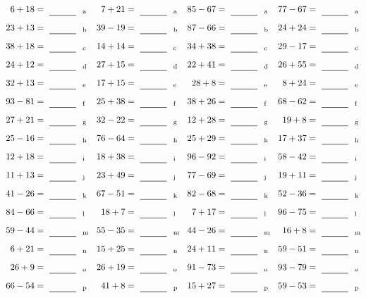 \documentclass
[
  draft    = true,
  fontsize = 11pt,
  parskip  = half-
]
{scrartcl}
\begin{document}
\clearpage
\begin{align*}
    \pline{6+18}&=\rline{a}
  & \pline{7+21}&=\rline{a}
  & \pline{85-67}&=\rline{a}
  & \pline{77-67}&=\rline{a} \\[1ex]
    \pline{23+13}&=\rline{b}
  & \pline{39-19}&=\rline{b}
  & \pline{87-66}&=\rline{b}
  & \pline{24+24}&=\rline{b} \\[1ex]
    \pline{38+18}&=\rline{c}
  & \pline{14+14}&=\rline{c}
  & \pline{34+38}&=\rline{c}
  & \pline{29-17}&=\rline{c} \\[1ex]
    \pline{24+12}&=\rline{d}
  & \pline{27+15}&=\rline{d}
  & \pline{22+41}&=\rline{d}
  & \pline{26+55}&=\rline{d} \\[1ex]
    \pline{32+13}&=\rline{e}
  & \pline{17+15}&=\rline{e}
  & \pline{28+8}&=\rline{e}
  & \pline{8+24}&=\rline{e} \\[1ex]
    \pline{93-81}&=\rline{f}
  & \pline{25+38}&=\rline{f}
  & \pline{38+26}&=\rline{f}
  & \pline{68-62}&=\rline{f} \\[1ex]
    \pline{27+21}&=\rline{g}
  & \pline{32-22}&=\rline{g}
  & \pline{12+28}&=\rline{g}
  & \pline{19+8}&=\rline{g} \\[1ex]
    \pline{25-16}&=\rline{h}
  & \pline{76-64}&=\rline{h}
  & \pline{25+29}&=\rline{h}
  & \pline{17+37}&=\rline{h} \\[1ex]
    \pline{12+18}&=\rline{i}
  & \pline{18+38}&=\rline{i}
  & \pline{96-92}&=\rline{i}
  & \pline{58-42}&=\rline{i} \\[1ex]
    \pline{11+13}&=\rline{j}
  & \pline{23+49}&=\rline{j}
  & \pline{77-69}&=\rline{j}
  & \pline{19+11}&=\rline{j} \\[1ex]
    \pline{41-26}&=\rline{k}
  & \pline{67-51}&=\rline{k}
  & \pline{82-68}&=\rline{k}
  & \pline{52-36}&=\rline{k} \\[1ex]
    \pline{84-66}&=\rline{l}
  & \pline{18+7}&=\rline{l}
  & \pline{7+17}&=\rline{l}
  & \pline{96-75}&=\rline{l} \\[1ex]
    \pline{59-44}&=\rline{m}
  & \pline{55-35}&=\rline{m}
  & \pline{44-26}&=\rline{m}
  & \pline{16+8}&=\rline{m} \\[1ex]
    \pline{6+21}&=\rline{n}
  & \pline{15+25}&=\rline{n}
  & \pline{24+11}&=\rline{n}
  & \pline{59-51}&=\rline{n} \\[1ex]
    \pline{26+9}&=\rline{o}
  & \pline{26+19}&=\rline{o}
  & \pline{91-73}&=\rline{o}
  & \pline{93-79}&=\rline{o} \\[1ex]
    \pline{66-54}&=\rline{p}
  & \pline{41+8}&=\rline{p}
  & \pline{15+27}&=\rline{p}
  & \pline{59-53}&=\rline{p}
\end{align*}
\end{document}
